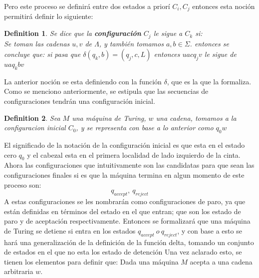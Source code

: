 \documentclass[10pt]{report}
\newtheorem{definition}{Definition}
\begin{document}
    Pero este proceso se definirá entre dos estados a priorí $C_{i},C_{j}$
    entonces esta noción permitirá definir lo siguiente:
    \begin{definition}
        Se dice que la \textbf{configuración} $C_{j}$ le sigue a $C_{k}$ si:\\
        Se toman las cadenas $u,v$ de $\Lambda$, y también tomamos $a,b\in \Sigma$.
        entonces se concluye que: si pasa que $\delta(q_{k},b) = (q_{j},c,L)$
        entonces $uacq_{j}v$ le sigue de $uaq_{k}bv$

    \end{definition}
    La anterior noción se esta definiendo con la función $\delta$, que es la que la formaliza.
    Como se menciono anteriormente, se estipula que las secuencias de configuraciones tendrán una configuración
    inicial.
    \begin{definition}
        Sea $M$ una máquina de Turing, $w$ una cadena, tomamos a
         la configuracion inicial $C_{0}$, y se representa con base a lo anterior como $q_{0}w$
        \end{definition}
    \newline
    El significado de la notación de la configuración inicial es que esta en
    el estado cero $q_{0}$ y el cabezal esta en el primera localidad de lado izquierdo de la cinta.
    Ahora las configuraciones que intuitivamente son las candidatas para
    que sean las configuraciones finales si es que la máquina termina en algun momento de este
    proceso son:\newline
    \begin{equation}
        q_{accept},\ q_{reject}\label{eq:equation8}
    \end{equation}
    A estas configuraciones se les nombrarán como configuraciones de paro, ya que están definidas
    en términos del estado en el que entran; que son los estado de paro y de aceptación respectivamente.\newline
    Entonces se formalizará que una máquina de Turing se detiene si entra en los estados
    $q_{accept} \ o \ q_{reject}$, y con base a esto se hará una generalización de la definición de la función delta, tomando
    un conjunto de estados en el que no esta los estado de detención
    \newline
    Una vez aclarado esto, se tienen los elementos para definir que:\newline
    Dada una máquina $M$ acepta a una
    cadena arbitraria $w$.  
\end{document}
